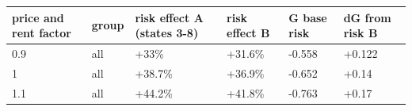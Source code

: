 \begingroup\small
\setlength{\tabcolsep}{3pt}
\renewcommand{\arraystretch}{1.04}
\begin{tabularx}{\linewidth}{XXXXXX}
\toprule
price and rent factor & group & risk effect A (states 3-8) & risk effect B & G base risk & dG from risk B \\
\midrule
0.9 & all & +33\% & +31.6\% & -0.558 & +0.122 \\
1 & all & +38.7\% & +36.9\% & -0.652 & +0.14 \\
1.1 & all & +44.2\% & +41.8\% & -0.763 & +0.17 \\
\bottomrule
\end{tabularx}
\endgroup
